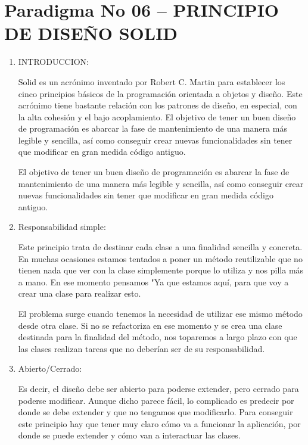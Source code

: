\section{Paradigma No 06 – PRINCIPIO DE DISEÑO SOLID} 



\begin{enumerate}[1.]


\item INTRODUCCION:


Solid es un acrónimo inventado por Robert C. Martin para establecer los cinco principios básicos de la programación orientada a objetos y diseño. Este acrónimo tiene bastante relación con los patrones de diseño, en especial, con la alta cohesión y el bajo acoplamiento.
El objetivo de tener un buen diseño de programación es abarcar la fase de mantenimiento de una manera más legible y sencilla, así como conseguir crear nuevas funcionalidades sin tener que modificar en gran medida código antiguo. 


El objetivo de tener un buen diseño de programación es abarcar la fase de mantenimiento de una manera más legible y sencilla, así como conseguir crear nuevas funcionalidades sin tener que modificar en gran medida código antiguo. 


\item Responsabilidad simple:

Este principio trata de destinar cada clase a una finalidad sencilla y concreta. En muchas ocasiones estamos tentados a poner un método reutilizable que no tienen nada que ver con la clase simplemente porque lo utiliza y nos pilla más a mano. En ese momento pensamos "Ya que estamos aquí, para que voy a crear una clase para realizar esto.

El problema surge cuando tenemos la necesidad de utilizar ese mismo método desde otra clase. Si no se refactoriza en ese momento y se crea una clase destinada para la finalidad del método, nos toparemos a largo plazo con que las clases realizan tareas que no deberían ser de su responsabilidad.

\item Abierto/Cerrado:

Es decir, el diseño debe ser abierto para poderse extender, pero cerrado para poderse modificar. Aunque dicho parece fácil, lo complicado es predecir por donde se debe extender y que no tengamos que modificarlo. Para conseguir este principio hay que tener muy claro cómo va a funcionar la aplicación, por donde se puede extender y cómo van a interactuar las clases.


\end{enumerate}
